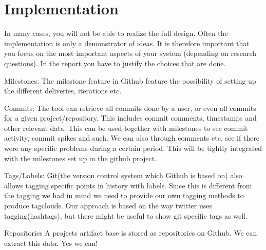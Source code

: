 \chapter{Implementation}
In many cases, you will not be able to realize the full design. Often the implementation is only a demonstrator of ideas. 
It is therefore important that you focus on the most important aspects of your system (depending on research questions). 
In the report you have to justify the choices that are done.

Milestones:
The milestone feature in Github feature the possibility of setting up the different deliveries, iterations etc.

Commits:
The tool can retrieve all commits done by a user, or even all commits for a given project/repository. This includes commit comments, timestamps and other relevant data. This can be used together with milestones to see commit activity, commit spikes and such. We can also through comments etc. see if there were any specific problems during a certain period. This will be tightly integrated with the milestones set up in the github project. 

Tags/Labels:
Git(the version control system which Github is based on) also allows tagging specific points in history with labels. Since this is different from the tagging we had in mind we need to provide our own tagging methods to produce tagclouds. Our approach is based on the way twitter uses tagging(hashtags), but there might be useful to show git specific tags as well.

Repositories
A projects artifact base is stored as repositories on Github. We can extract this data. Yes we can!

